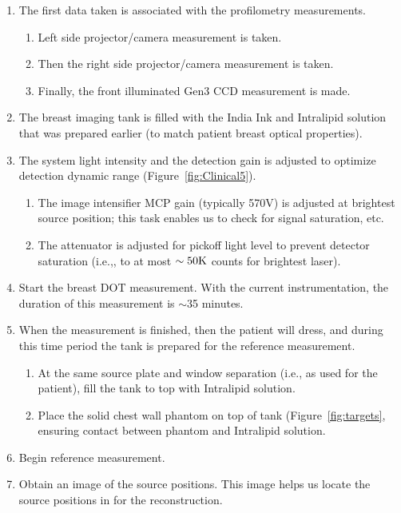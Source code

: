\begin{enumerate}[noitemsep]
\begin{enumerate}[noitemsep]
    \end{enumerate}
\item The first data taken is associated with the profilometry measurements.
    \begin{enumerate}[noitemsep]
    \item Left side projector/camera measurement is taken.
    \item Then the right side projector/camera measurement is taken.
    \item Finally, the front illuminated Gen3 CCD measurement is made.
    \end{enumerate}
\item The breast imaging tank is filled with the India Ink and Intralipid solution that was prepared earlier (to match patient breast optical properties).
\item The system light intensity and the detection gain is adjusted to optimize detection dynamic range (Figure~\ref{fig:Clinical5}).
    \begin{enumerate}[noitemsep]
    \item The image intensifier MCP gain (typically 570V) is adjusted at brightest source position; this task enables us to check for signal saturation, etc.
    \item The attenuator is adjusted for pickoff light level to prevent detector saturation (i.e.,, to at most $\sim 50\rm{K}$ counts for brightest laser).
    \end{enumerate}
\item Start the breast DOT measurement. With the current instrumentation, the duration of this measurement is $\sim$35 minutes.
\item When the measurement is finished, then the patient will dress, and during this time period the tank is prepared for the reference measurement.
    \begin{enumerate}[noitemsep]
    \item At the same source plate and window separation (i.e., as used for the patient), fill the tank to top with Intralipid solution.
    \item Place the solid chest wall phantom on top of tank (Figure~\ref{fig:targets}, ensuring contact between phantom and Intralipid solution.
    \end{enumerate}
\item Begin reference measurement.
\item Obtain an image of the source positions. This image helps us locate the source positions in for the reconstruction.

\end{enumerate}
